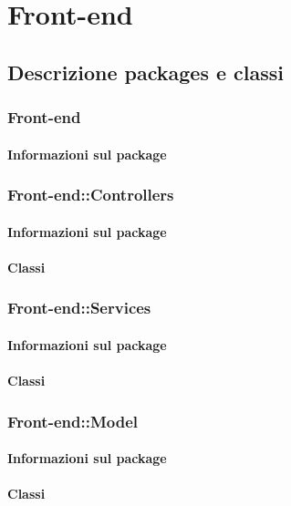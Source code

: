 \section{Front-end}

	\subsection{Descrizione packages e classi}
	
		\subsubsection{Front-end}
		\paragraph{Informazioni sul package}
	
		\subsubsection{Front-end::Controllers}
		\paragraph{Informazioni sul package}
		\paragraph{Classi}
		
		\subsubsection{Front-end::Services}
		\paragraph{Informazioni sul package}
		\paragraph{Classi}
		
		\subsubsection{Front-end::Model}
		\paragraph{Informazioni sul package}
		\paragraph{Classi}
	